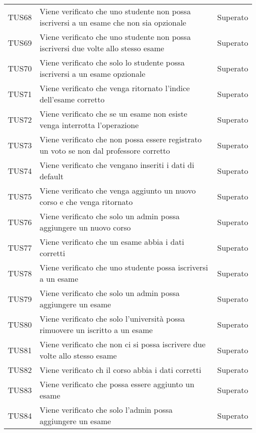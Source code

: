\documentclass[PianoDiQualifica.tex]{subfiles}
\begin{document}
\begin{longtable}[H]{P{2cm}P{8.5cm}P{3cm}}
	TUS68 & Viene verificato che uno studente non possa iscriversi a un esame che non sia opzionale & Superato \\
	TUS69 & Viene verificato che uno studente non possa iscriversi due volte allo stesso esame & Superato \\
	TUS70 & Viene verificato che solo lo studente possa iscriversi a un esame opzionale & Superato \\
	TUS71 & Viene verificato che venga ritornato l'indice dell'esame corretto & Superato \\
	TUS72 & Viene verificato che se un esame non esiste venga interrotta l'operazione & Superato \\
	TUS73 & Viene verificato che non possa essere registrato un voto se non dal professore corretto & Superato \\
	TUS74 & Viene verificato che vengano inseriti i dati di default & Superato \\
	TUS75 & Viene verificato che venga aggiunto un nuovo corso e che venga ritornato & Superato \\
	TUS76 & Viene verificato che solo un admin possa aggiungere un nuovo corso & Superato \\
	TUS77 & Viene verificato che un esame abbia i dati corretti & Superato \\
	TUS78 & Viene verificato che uno studente possa iscriversi a un esame & Superato \\
	TUS79 & Viene verificato che solo un admin possa aggiungere un esame & Superato \\
	TUS80 & Viene verificato che solo l'università possa rimuovere un iscritto a un esame & Superato \\
	TUS81 & Viene verificato che non ci si possa iscrivere due volte allo stesso esame & Superato \\
	TUS82 & Viene verificato ch il corso abbia i dati corretti & Superato \\
	TUS83 & Viene verificato che possa essere aggiunto un esame & Superato \\
	TUS84 & Viene verificato che solo l'admin possa aggiungere un esame & Superato \\
	

\end{longtable}
\end{document}
